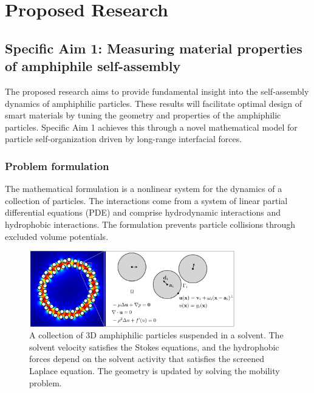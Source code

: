 \section{Proposed Research}
\label{sec:proposed-work}



\subsection{Specific Aim 1: Measuring material properties of amphiphile
  self-assembly}
\label{subsec:specific_aim_1}

The proposed research aims to provide fundamental insight into the
self-assembly dynamics of amphiphilic particles. These results will
facilitate optimal design of smart materials by tuning the geometry and
properties of the amphiphilic particles.
Specific Aim 1 achieves this through a novel mathematical model
for particle self-organization driven by long-range interfacial forces. 

\subsubsection{Problem formulation}
The mathematical formulation is a nonlinear system 
for the dynamics of a collection of particles. The 
interactions come from a system of linear partial differential equations
(PDE) and comprise hydrodynamic interactions and hydrophobic interactions.
The formulation prevents particle collisions through excluded volume
potentials. 

  \begin{figure}[h!]
\begin{center}
  \includegraphics[width=0.8\textwidth]{figures/SpecificAim1/Domain.pdf}
\end{center}  
  \caption{\label{fig:flow_map} A collection of 3D
   amphiphilic particles suspended in a solvent. The solvent velocity
   satisfies the Stokes equations, and the hydrophobic forces depend on
   the solvent activity that satisfies the screened Laplace equation.
   The geometry is updated by solving the mobility problem.}     
  \end{figure}

